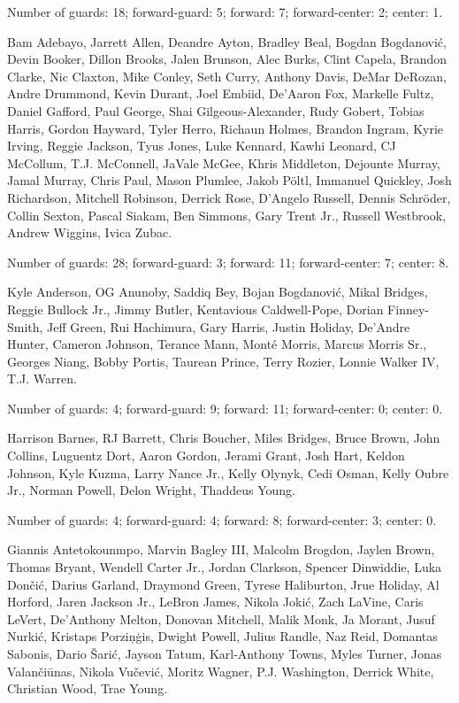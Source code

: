 \documentclass[USenglish]{article}
\theoremstyle{dgthm}
\theoremstyle{dgdef}
\begin{document}
\begin{appendix}
\begin{description}
	      Number of guards: 18; forward-guard: 5; forward: 7; forward-center: 2; center: 1.

	\item[Cluster 2]  Bam Adebayo, Jarrett Allen, Deandre Ayton, Bradley Beal, Bogdan Bogdanović, Devin Booker, Dillon Brooks, Jalen Brunson, Alec Burks, Clint Capela, Brandon Clarke, Nic Claxton, Mike Conley, Seth Curry, Anthony Davis, DeMar DeRozan, Andre Drummond, Kevin Durant, Joel Embiid, De'Aaron Fox, Markelle Fultz, Daniel Gafford, Paul George, Shai Gilgeous-Alexander, Rudy Gobert, Tobias Harris, Gordon Hayward, Tyler Herro, Richaun Holmes, Brandon Ingram, Kyrie Irving, Reggie Jackson, Tyus Jones, Luke Kennard, Kawhi Leonard, CJ McCollum, T.J. McConnell, JaVale McGee, Khris Middleton, Dejounte Murray, Jamal Murray, Chris Paul, Mason Plumlee, Jakob Pöltl, Immanuel Quickley, Josh Richardson, Mitchell Robinson, Derrick Rose, D'Angelo Russell, Dennis Schröder, Collin Sexton, Pascal Siakam, Ben Simmons, Gary Trent Jr., Russell Westbrook, Andrew Wiggins, Ivica Zubac.

	      Number of guards: 28; forward-guard: 3; forward: 11; forward-center: 7; center: 8.

	\item[Cluster 3] Kyle Anderson, OG Anunoby, Saddiq Bey, Bojan Bogdanović, Mikal Bridges, Reggie Bullock Jr., Jimmy Butler, Kentavious Caldwell-Pope, Dorian Finney-Smith, Jeff Green, Rui Hachimura, Gary Harris, Justin Holiday, De'Andre Hunter, Cameron Johnson, Terance Mann, Monté Morris, Marcus Morris Sr., Georges Niang, Bobby Portis, Taurean Prince, Terry Rozier, Lonnie Walker IV, T.J. Warren.

	      Number of guards: 4; forward-guard: 9; forward: 11; forward-center: 0; center: 0.

	\item[Cluster 4]  Harrison Barnes, RJ Barrett, Chris Boucher, Miles Bridges, Bruce Brown, John Collins, Luguentz Dort, Aaron Gordon, Jerami Grant, Josh Hart, Keldon Johnson, Kyle Kuzma, Larry Nance Jr., Kelly Olynyk, Cedi Osman, Kelly Oubre Jr., Norman Powell, Delon Wright, Thaddeus Young.

	      Number of guards: 4; forward-guard: 4; forward: 8; forward-center: 3; center: 0.

	\item[Cluster 5]  Giannis Antetokounmpo, Marvin Bagley III, Malcolm Brogdon, Jaylen Brown, Thomas Bryant, Wendell Carter Jr., Jordan Clarkson, Spencer Dinwiddie, Luka Dončić, Darius Garland, Draymond Green, Tyrese Haliburton, Jrue Holiday, Al Horford, Jaren Jackson Jr., LeBron James, Nikola Jokić, Zach LaVine, Caris LeVert, De'Anthony Melton, Donovan Mitchell, Malik Monk, Ja Morant, Jusuf Nurkić, Kristaps Porziņģis, Dwight Powell, Julius Randle, Naz Reid, Domantas Sabonis, Dario Šarić, Jayson Tatum, Karl-Anthony Towns, Myles Turner, Jonas Valančiūnas, Nikola Vučević, Moritz Wagner, P.J. Washington, Derrick White, Christian Wood, Trae Young.


\end{description}
\end{appendix}
\end{document}
